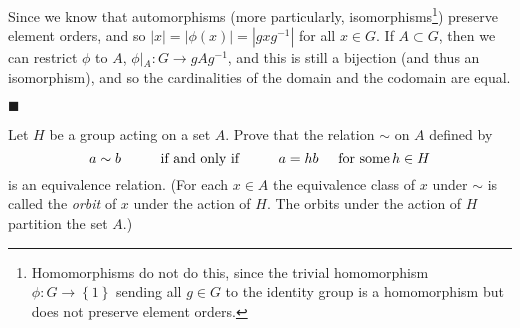 \documentclass[12pt]{article}
\renewcommand{\qed}{\hfill$\blacksquare$}
\renewenvironment{proof}{\begin{addmargin}[1em]{0em}\begin{newproof}}{\end{newproof}\end{addmargin}\qed}
\newenvironment{problem}[2][Exercise]{\begin{trivlist}
\item[\hskip \labelsep {\bfseries #1}\hskip \labelsep {\bfseries #2.}]}{\end{trivlist}}
\begin{document}
\begin{proof}
{\color{red}Since we know that automorphisms (more particularly, isomorphisms\footnote{Homomorphisms do not do this, since the trivial homomorphism $\phi:G\rightarrow \left\{1\right\}$ sending all $g\in G$ to the identity group is a homomorphism but does not preserve element orders.}) preserve element orders, and so $\left|x\right|=\left|\phi\left(x\right)\right|=\left|gxg^{-1}\right|$ for all $x\in G$. If $A\subset G$, then we can restrict $\phi$ to $A$, $\phi\left|_{A}\right. :G\rightarrow gAg^{-1}$, and this is still a bijection (and thus an isomorphism), and so the cardinalities of the domain and the codomain are equal.}
\end{proof}



\begin{problem}{1.7.18}
Let $H$ be a group acting on a set $A$. Prove that the relation $\sim$ on $A$ defined by
$$ a\sim b \hspace{10mm} \text{if and only if} \hspace{10mm} a=hb \hspace{5mm} \text{for some} \, h\in H $$
is an equivalence relation. (For each $x\in A$ the equivalence class of $x$ under $\sim$ is called the \textit{orbit} of $x$ under the action of $H$. The orbits under the action of $H$ partition the set $A$.)
\end{problem}
\end{document}
